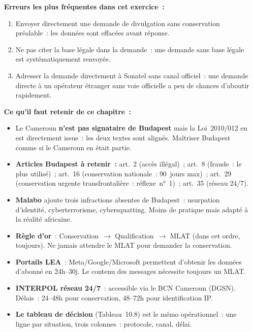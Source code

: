 \begin{boxalert}
\textbf{Erreurs les plus fréquentes dans cet exercice~:}
\begin{enumerate}
    \item Envoyer directement une demande de divulgation sans conservation
          préalable~: les données sont effacées avant réponse.
    \item Ne pas citer la base légale dans la demande~: une demande sans
          base légale est systématiquement renvoyée.
    \item Adresser la demande directement à Sonatel sans canal officiel~:
          une demande directe à un opérateur étranger sans voie officielle
          a peu de chances d'aboutir rapidement.
\end{enumerate}
\end{boxalert}

\separateur

\begin{boxresume}
\textbf{Ce qu'il faut retenir de ce chapitre~:}
\begin{itemize}
    \item Le Cameroun \textbf{n'est pas signataire de Budapest} mais la
          Loi~2010/012 en est directement issue~: les deux textes sont
          alignés. Maîtriser Budapest comme si le Cameroun en était partie.

    \item \textbf{Articles Budapest à retenir~:} art.~2 (accès illégal)~;
          art.~8 (fraude~: le plus utilisé)~; art.~16 (conservation
          nationale~: 90~jours max)~; art.~29 (conservation urgente
          transfrontalière~: réflexe~n°~1)~; art.~35 (réseau 24/7).

    \item \textbf{Malabo} ajoute trois infractions absentes de Budapest~:
          usurpation d'identité, cyberterrorisme, cybersquatting. Moins
          de pratique mais adapté à la réalité africaine.

    \item \textbf{Règle d'or}~: Conservation~$\to$ Qualification~$\to$
          MLAT (dans cet ordre, toujours). Ne jamais attendre le MLAT
          pour demander la conservation.

    \item \textbf{Portails LEA}~: Meta/Google/Microsoft permettent
          d'obtenir les données d'abonné en 24h--30j. Le contenu des
          messages nécessite toujours un MLAT.

    \item \textbf{INTERPOL réseau 24/7}~: accessible via le BCN
          Cameroun (DGSN). Délais~: 24--48h pour conservation,
          48--72h pour identification IP.

    \item \textbf{Le tableau de décision} (Tableau~10.8) est le mémo
          opérationnel~: une ligne par situation, trois colonnes~:
          protocole, canal, délai.
\end{itemize}
\end{boxresume}

